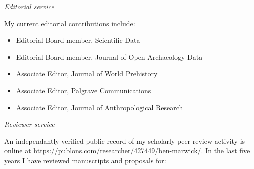 \medskip

\noindent\emph{Editorial service\vspace{0.01in}}

\medskip

My current editorial contributions include:

\begin{itemize}[noitemsep, font=$\bullet$\scshape\bfseries]
\item Editorial Board member, Scientific Data
\item Editorial Board member, Journal of Open Archaeology Data
\item Associate Editor, Journal of World Prehistory
\item Associate Editor, Palgrave Communications 
\item Associate Editor, Journal of Anthropological Research
\end{itemize}

\medskip

\noindent\emph{Reviewer service\vspace{0.01in}}

\medskip

An independantly verified public record of my scholarly peer review activity is online at \href{https://publons.com/researcher/427449/ben-marwick}{https://publons.com/researcher/427449/ben-marwick/}. In the last five years I have reviewed manuscripts and proposals for:

